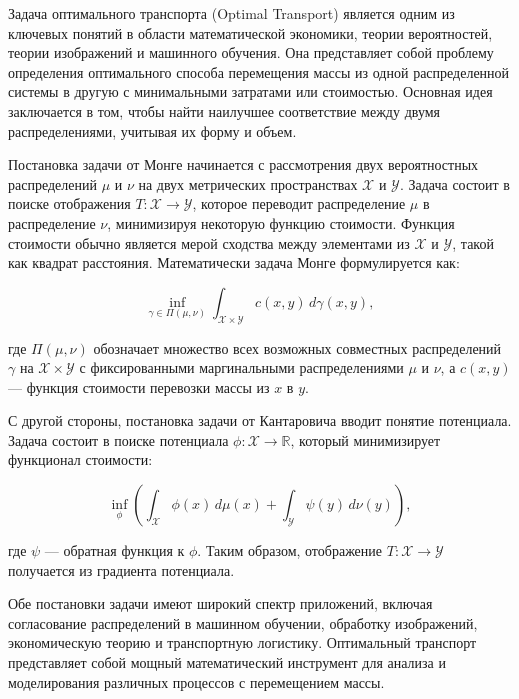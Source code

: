 Задача оптимального транспорта (Optimal Transport) является одним из ключевых понятий в области математической экономики, теории вероятностей, теории изображений и машинного обучения. Она представляет собой проблему определения оптимального способа перемещения массы из одной распределенной системы в другую с минимальными затратами или стоимостью. Основная идея заключается в том, чтобы найти наилучшее соответствие между двумя распределениями, учитывая их форму и объем.

Постановка задачи от Монге начинается с рассмотрения двух вероятностных распределений \( \mu \) и \( \nu \) на двух метрических пространствах \( \mathcal{X} \) и \( \mathcal{Y} \). Задача состоит в поиске отображения \( T: \mathcal{X} \rightarrow \mathcal{Y} \), которое переводит распределение \( \mu \) в распределение \( \nu \), минимизируя некоторую функцию стоимости. Функция стоимости обычно является мерой сходства между элементами из \( \mathcal{X} \) и \( \mathcal{Y} \), такой как квадрат расстояния. Математически задача Монге формулируется как:

\[ \inf_{\gamma \in \Pi(\mu, \nu)} \int_{\mathcal{X} \times \mathcal{Y}} c(x,y) \, d\gamma(x,y), \]

где \( \Pi(\mu, \nu) \) обозначает множество всех возможных совместных распределений \( \gamma \) на \( \mathcal{X} \times \mathcal{Y} \) с фиксированными маргинальными распределениями \( \mu \) и \( \nu \), а \( c(x,y) \) — функция стоимости перевозки массы из \( x \) в \( y \).

С другой стороны, постановка задачи от Кантаровича вводит понятие потенциала. Задача состоит в поиске потенциала \( \phi: \mathcal{X} \rightarrow \mathbb{R} \), который минимизирует функционал стоимости:

\[ \inf_{\phi} \left( \int_{\mathcal{X}} \phi(x) \, d\mu(x) + \int_{\mathcal{Y}} \psi(y) \, d\nu(y) \right), \]

где \( \psi \) — обратная функция к \( \phi \). Таким образом, отображение \( T: \mathcal{X} \rightarrow \mathcal{Y} \) получается из градиента потенциала.

Обе постановки задачи имеют широкий спектр приложений, включая согласование распределений в машинном обучении, обработку изображений, экономическую теорию и транспортную логистику. Оптимальный транспорт представляет собой мощный математический инструмент для анализа и моделирования различных процессов с перемещением массы.
